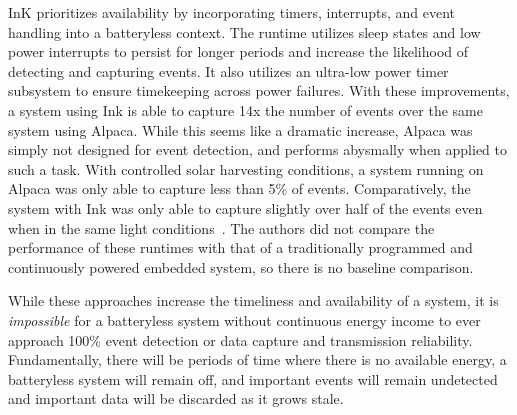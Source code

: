 InK prioritizes availability by incorporating timers, interrupts, and event handling into a batteryless context.
The runtime utilizes sleep states and low power interrupts to persist for longer periods and increase the likelihood of detecting and capturing events. It also utilizes an ultra-low power timer subsystem to ensure timekeeping across power failures.
With these improvements, a system using Ink is able to capture 14x the number of events over the same system using Alpaca.
While this seems like a dramatic increase, Alpaca was simply not designed for event detection, and performs abysmally 
when applied to such a task. With controlled solar harvesting conditions, a system running on Alpaca was only able to capture less than 5\% of events. 
Comparatively, the system with Ink was only able to capture slightly over half of the events even when in the same light conditions~\cite{yildirim2018ink}. The authors did not compare the performance of these runtimes with that of a traditionally programmed and continuously powered embedded system, so there is no baseline comparison.

While these approaches increase the timeliness and availability of a system,
it is \textit{impossible} for a batteryless system without continuous energy income to ever approach 100\% event detection or data capture and transmission reliability.
Fundamentally, there will be periods of time where there is no available energy, a batteryless system will remain off, and important events will remain undetected and important data will be discarded as it grows stale.


